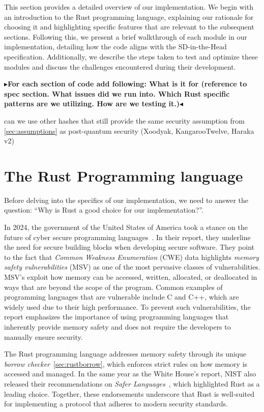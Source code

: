 \documentclass[11pt]{report}
\theoremstyle{definition}
\theoremstyle{plain}
\newcommand{\todo}[1]{{\color[rgb]{.5,0,0}\textbf{$\blacktriangleright$#1$\blacktriangleleft$}}}
\begin{document}
This section provides a detailed overview of our implementation. We begin with an introduction to the Rust programming language, explaining our rationale for choosing it and highlighting specific features that are relevant to the subsequent sections. Following this, we present a brief walkthrough of each module in our implementation, detailing how the code aligns with the SD-in-the-Head specification. Additionally, we describe the steps taken to test and optimize these modules and discuss the challenges encountered during their development.

\todo{For each section of code add following: What is it for (reference to spec section. What issues did we run into. Which Rust specific patterns are we utilizing. How are we testing it.)}

can we use other hashes that still provide the same security assumption from \autoref{sec:assumptions} as post-quantum security (Xoodyak, KangarooTwelve, Haraka v2)

\section{The Rust Programming language}\label{sec:rust}

Before delving into the specifics of our implementation, we need to answer the question: ``Why is Rust a good choice for our implementation?''.

In 2024, the government of the United States of America took a stance on the future of cyber secure programming languages~\cite{whitehouse2024memorysafe}. In their report, they underline the need for secure building blocks when developing secure software. They point to the fact that \textit{Common Weakness Enumeration} (CWE) data highlights \textit{memory safety vulnerabilities} (MSV) as one of the most pervasive classes of vulnerabilities. MSV's exploit how memory can be accessed, written, allocated, or deallocated in ways that are beyond the scope of the program. Common examples of programming languages that are vulnerable include C and C++, which are widely used due to their high performance. To prevent such vulnerabilities, the report emphasizes the importance of using programming languages that inherently provide memory safety and does not require the developers to manually ensure security.

The Rust programming language addresses memory safety through its unique \textit{borrow checker}~\autoref{sec:rustborrow}, which enforces strict rules on how memory is accessed and managed. In the same year as the White House's report, NIST also released their recommendations on \textit{Safer Languages}~\cite{nistsaferlanguages}, which highlighted Rust as a leading choice. Together, these endorsements underscore that Rust is well-suited for implementing a protocol that adheres to modern security standards.
\end{document}
